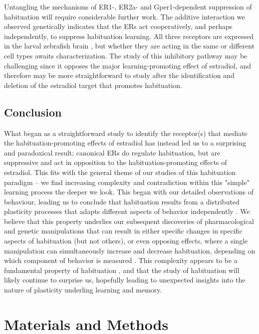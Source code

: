 \documentclass[9pt,lineno]{RandlettLab_elife}
\begin{document}
{Untangling the mechanisms of ER1-, ER2a- and Gper1-dependent suppression of habituation will require considerable further work. 
The additive interaction we observed genetically indicates that the ERs act cooperatively, and perhaps independently, to suppress habituation learning.
All three receptors are expressed in the larval zebrafish brain \citep{Thisse2008-vr,Romano2017-ep}, but whether they are acting in the same or different cell types awaits characterization. 
The study of this inhibitory pathway may be challenging since it opposes the major learning-promoting effect of estradiol, and therefore may be more straightforward to study after the identification and deletion of the estradiol target that promotes habituation. 

\subsection{Conclusion}

What began as a straightforward study to identify the receptor(s) that mediate the habituation-promoting effects of estradiol has instead led us to a surprising and paradoxical result; 
canonical ERs do regulate habituation, but are suppressive and act in opposition to the habituation-promoting effects of estradiol. 
This fits with the general theme of our studies of this habituation paradigm -- we find increasing complexity and contradiction within this "simple" learning process the deeper we look. 
This began with our detailed observations of behaviour, leading us to conclude that habituation results from a distributed plasticity processes that adapts different aspects of behavior independently \citep{Randlett2019-fj}. 
We believe that this property underlies our subsequent discoveries of pharmacological and genetic manipulations that can result in either specific changes in specific aspects of habituation (but not others), or even opposing effects, where a single manipulation can simultaneously increase and decrease habituation, depending on which component of behavior is measured \citep{Randlett2019-fj,Lamire2023-he}.
This complexity appears to be a fundamental property of habituation \citep{McDiarmid2019-td}, and that the study of habituation will likely continue to surprise us, hopefully leading to unexpected insights into the nature of plasticity underling learning and memory.

\section{Materials and Methods}

}
\end{document}
